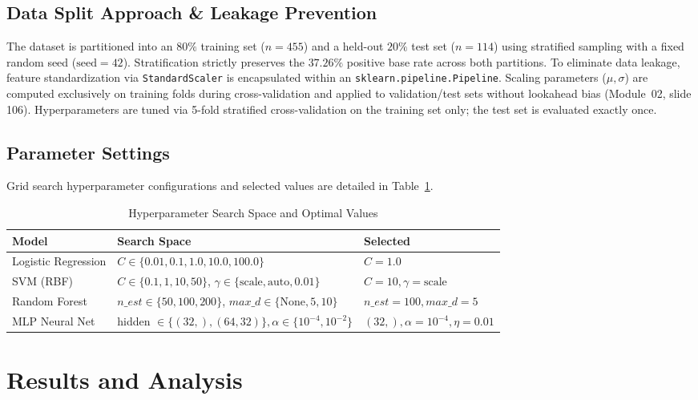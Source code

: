 \documentclass[10pt,journal,compsoc,twocolumn]{IEEEtran}
\begin{document}
\subsection{Data Split Approach \& Leakage Prevention}
The dataset is partitioned into an $80\%$ training set ($n=455$) and a held-out $20\%$ test set ($n=114$) using stratified sampling with a fixed random seed ($\text{seed}=42$). Stratification strictly preserves the $37.26\%$ positive base rate across both partitions. To eliminate data leakage, feature standardization via \texttt{StandardScaler} is encapsulated within an \texttt{sklearn.pipeline.Pipeline}. Scaling parameters ($\mu, \sigma$) are computed exclusively on training folds during cross-validation and applied to validation/test sets without lookahead bias (Module~02, slide 106). Hyperparameters are tuned via 5-fold stratified cross-validation on the training set only; the test set is evaluated exactly once.

\subsection{Parameter Settings}
Grid search hyperparameter configurations and selected values are detailed in Table~\ref{tab:hyperparams}.

\begin{table}[htbp]
\centering
\caption{Hyperparameter Search Space and Optimal Values}
\label{tab:hyperparams}
\begin{tabular}{lll}
\toprule
\textbf{Model} & \textbf{Search Space} & \textbf{Selected} \\
\midrule
Logistic Regression & $C \in \{0.01, 0.1, 1.0, 10.0, 100.0\}$ & $C = 1.0$ \\
SVM (RBF) & $C \in \{0.1, 1, 10, 50\}$, $\gamma \in \{\text{scale}, \text{auto}, 0.01\}$ & $C = 10, \gamma = \text{scale}$ \\
Random Forest & $n\_est \in \{50, 100, 200\}$, $max\_d \in \{\text{None}, 5, 10\}$ & $n\_est=100, max\_d=5$ \\
MLP Neural Net & hidden $\in \{(32,), (64, 32)\}, \alpha \in \{10^{-4}, 10^{-2}\}$ & $(32,), \alpha=10^{-4}, \eta=0.01$ \\
\bottomrule
\end{tabular}
\end{table}

\section{Results and Analysis}
\end{document}
